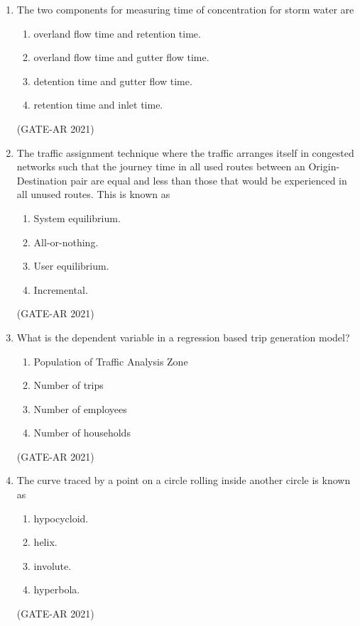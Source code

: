 \documentclass[a4paper,10pt]{article}
\begin{document}
\begin{enumerate}
    \item The two components for measuring time of concentration for storm water are 
    \begin{enumerate}
        \item overland flow time and retention time.
        \item overland flow time and gutter flow time.
        \item detention time and gutter flow time.
        \item retention time and inlet time.
    \end{enumerate}
    \hfill (GATE-AR 2021)

    \item The traffic assignment technique where the traffic arranges itself in congested networks such that the journey time in all used routes between an Origin-Destination pair are equal and less than those that would be experienced in all unused routes. This is known as 
    \begin{multicols}{2}
    \begin{enumerate}
        \item System equilibrium.
        \item All-or-nothing.
        \item User equilibrium.
        \item Incremental.
    \end{enumerate}
    \end{multicols}
    \hfill (GATE-AR 2021)

    \item What is the dependent variable in a regression based trip generation model? 
    \begin{enumerate}
        \item Population of Traffic Analysis Zone
        \item Number of trips
        \item Number of employees
        \item Number of households
    \end{enumerate}
    \hfill (GATE-AR 2021)

    \item The curve traced by a point on a circle rolling inside another circle is known as 
    \begin{multicols}{4}
    \begin{enumerate}
        \item hypocycloid.
        \item helix.
        \item involute.
        \item hyperbola.
    \end{enumerate}
    \end{multicols}
    \hfill (GATE-AR 2021)


\end{enumerate}
\end{document}
